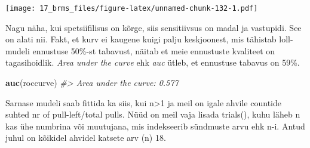 \documentclass[]{book}
\newenvironment{Shaded}{\begin{snugshade}}{\end{snugshade}}
\newcommand{\KeywordTok}[1]{\textcolor[rgb]{0.13,0.29,0.53}{\textbf{#1}}}
\newcommand{\DataTypeTok}[1]{\textcolor[rgb]{0.13,0.29,0.53}{#1}}
\newcommand{\DecValTok}[1]{\textcolor[rgb]{0.00,0.00,0.81}{#1}}
\newcommand{\FloatTok}[1]{\textcolor[rgb]{0.00,0.00,0.81}{#1}}
\newcommand{\StringTok}[1]{\textcolor[rgb]{0.31,0.60,0.02}{#1}}
\newcommand{\CommentTok}[1]{\textcolor[rgb]{0.56,0.35,0.01}{\textit{#1}}}
\newcommand{\OperatorTok}[1]{\textcolor[rgb]{0.81,0.36,0.00}{\textbf{#1}}}
\newcommand{\NormalTok}[1]{#1}
\begin{document}
\begin{Shaded}
\end{Shaded}

\texttt{[image: 17\_brms\_files/figure-latex/unnamed-chunk-132-1.pdf]}

Nagu näha, kui spetsiifilisus on kõrge, siis sensitiivsus on madal ja
vastupidi. See on alati nii. Fakt, et kurv ei kaugene kuigi palju
keskjoonest, mis tähistab loll-mudeli ennustuse 50\%-st tabavust, näitab
et meie ennustuste kvaliteet on tagasihoidlik. \emph{Area under the
curve} ehk \emph{auc} ütleb, et ennustuse tabavus on 59\%.

\begin{Shaded}
\begin{Highlighting}[]
\KeywordTok{auc}\NormalTok{(roccurve)}
\CommentTok{#> Area under the curve: 0.577}
\end{Highlighting}
\end{Shaded}

Sarnase mudeli saab fittida ka siis, kui n\textgreater{}1 ja meil on
igale ahvile countide suhted nr of pull-left/total pulls. Nüüd on meil
vaja lisada trials(), kuhu läheb n kas ühe numbrina või muutujana, mis
indekseerib sündmuste arvu ehk n-i. Antud juhul on kõikidel ahvidel
katsete arv (n) 18.

\begin{Shaded}
\end{Shaded}
\end{document}
